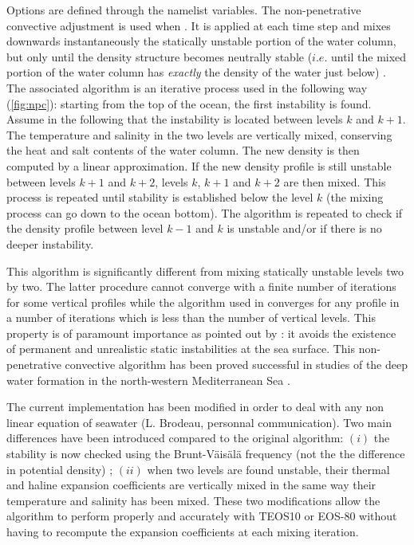 \documentclass[../tex_main/NEMO_manual]{subfiles}
\begin{document}
Options are defined through the   namelist variables.
The non-penetrative convective adjustment is used when . 
It is applied at each  time step and mixes downwards instantaneously 
the statically unstable portion of the water column, but only until the density 
structure becomes neutrally stable ($i.e.$ until the mixed portion of the water 
column has \textit{exactly} the density of the water just below) \citep{Madec_al_JPO91}. 
The associated algorithm is an iterative process used in the following way 
(\autoref{fig:npc}): starting from the top of the ocean, the first instability is 
found. Assume in the following that the instability is located between levels 
$k$ and $k+1$. The temperature and salinity in the two levels are 
vertically mixed, conserving the heat and salt contents of the water column. 
The new density is then computed by a linear approximation. If the new 
density profile is still unstable between levels $k+1$ and $k+2$, levels $k$, 
$k+1$ and $k+2$ are then mixed. This process is repeated until stability is 
established below the level $k$ (the mixing process can go down to the 
ocean bottom). The algorithm is repeated to check if the density profile 
between level $k-1$ and $k$ is unstable and/or if there is no deeper instability.

This algorithm is significantly different from mixing statically unstable levels 
two by two. The latter procedure cannot converge with a finite number 
of iterations for some vertical profiles while the algorithm used in \NEMO 
converges for any profile in a number of iterations which is less than the 
number of vertical levels. This property is of paramount importance as 
pointed out by \citet{Killworth1989}: it avoids the existence of permanent 
and unrealistic static instabilities at the sea surface. This non-penetrative 
convective algorithm has been proved successful in studies of the deep 
water formation in the north-western Mediterranean Sea 
\citep{Madec_al_JPO91, Madec_al_DAO91, Madec_Crepon_Bk91}.

The current implementation has been modified in order to deal with any non linear 
equation of seawater (L. Brodeau, personnal communication). 
Two main differences have been introduced compared to the original algorithm: 
$(i)$ the stability is now checked using the Brunt-V\"{a}is\"{a}l\"{a} frequency 
(not the the difference in potential density) ; 
$(ii)$ when two levels are found unstable, their thermal and haline expansion coefficients 
are vertically mixed in the same way their temperature and salinity has been mixed.
These two modifications allow the algorithm to perform properly and accurately 
with TEOS10 or EOS-80 without having to recompute the expansion coefficients at each 
mixing iteration.
\end{document}
